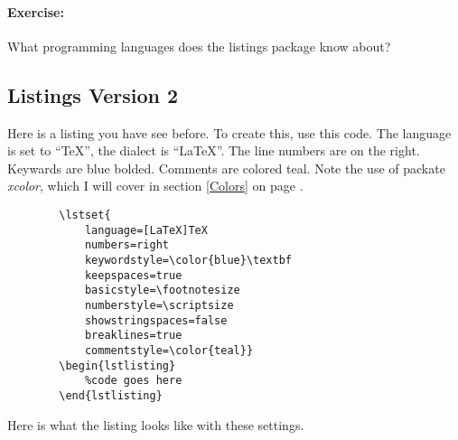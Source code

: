         \paragraph{Exercise:} What programming languages does the listings package know about?

        \subsection{Listings Version 2}
        \label{Listings Version 2}
        
        Here is a listing you have see before. To create this, use this code. The language is set to ``TeX'', the dialect is ``LaTeX''. The line numbers are on the right. Keywards are blue bolded. Comments are colored teal. Note the use of packate \textit{xcolor}, which I will cover in section \ref{Colors} on page \pageref{Colors}.

        \begin{verbatim}
        \lstset{
            language=[LaTeX]TeX
            numbers=right
            keywordstyle=\color{blue}\textbf
            keepspaces=true
            basicstyle=\footnotesize
            numberstyle=\scriptsize
            showstringspaces=false
            breaklines=true
            commentstyle=\color{teal}}
        \begin{lstlisting}
            %code goes here
        \end{lstlisting}
        \end{verbatim}

        Here is what the listing looks like with these settings.

